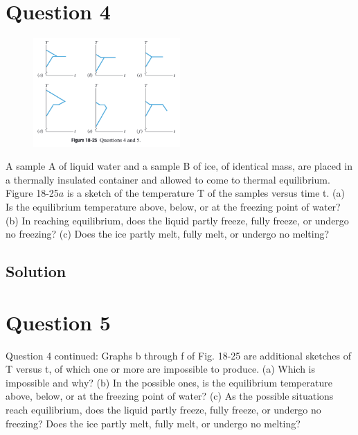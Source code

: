 \documentclass[12pt]{article}
\begin{document}
    

    \section{Question 4}
        \begin{figure}
            \vspace{-30pt}
            \includegraphics[width=0.5\textwidth]{picture_18-25.png} 
        \end{figure}
        A sample A of liquid water and a sample B of ice, of identical mass, are placed in a thermally insulated container and allowed to come to thermal equilibrium. Figure 18-25$a$ is a sketch of the temperature T of the samples versus time t. (a) Is the equilibrium temperature above, below, or at the freezing point of water? (b) In reaching equilibrium, does the liquid partly freeze, fully freeze, or undergo no freezing? (c) Does the ice partly melt, fully melt, or undergo no melting?

    \subsection{Solution}

    \pagebreak
    \section{Question 5}
        Question 4 continued: Graphs b through f of Fig. 18-25 are additional sketches of T versus t, of which one or more are impossible to produce. (a) Which is impossible and why? (b) In the possible ones, is the equilibrium temperature above, below, or at the freezing point of water? (c) As the possible situations reach equilibrium, does the liquid partly freeze, fully freeze, or undergo no freezing? Does the ice partly melt, fully melt, or undergo no melting?
\end{document}
